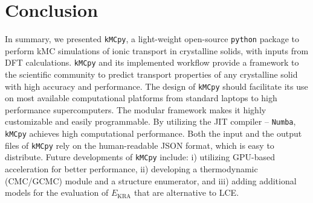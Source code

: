 \documentclass[a4paper,fleqn]{cas-dc}
\begin{document}
\section{Conclusion}\label{sec:conclusion}
\noindent In summary, we presented \texttt{kMCpy},  a light-weight open-source \texttt{python} package  to perform kMC simulations of ionic transport in crystalline solids, with inputs from DFT calculations. \texttt{kMCpy} and its implemented workflow provide a framework to the scientific community to predict transport properties of any crystalline solid with high accuracy and performance. The design of \texttt{kMCpy} should facilitate its use on most available computational platforms from standard laptops to high performance supercomputers. The modular framework makes it highly customizable and easily programmable. By utilizing the JIT compiler -- \texttt{Numba}, \texttt{kMCpy} achieves high computational performance. Both the input and the output files of \texttt{kMCpy} rely on the human-readable JSON format, which is easy to distribute. Future developments of \texttt{kMCpy} include: i) utilizing GPU-based acceleration for better performance, ii) developing a thermodynamic (CMC/GCMC) module and a structure enumerator, and iii) adding additional models for the evaluation of $E_{\mathrm{KRA}}$ that are alternative to LCE. 

\appendix
\end{document}

